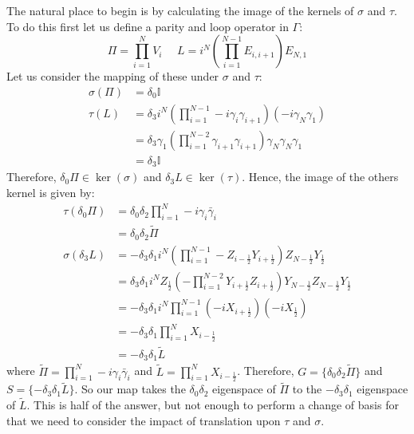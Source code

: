 \documentclass{article}
\begin{document}
The natural place to begin is by calculating the image of the kernels of $\sigma$ and $\tau$. To do this first let us define a parity and loop operator in $\Gamma$:
\begin{equation}
    \Pi = \prod_{i=1}^N V_i \>\>\>\>\>\> L = i^N \left( \prod_{i=1}^{N-1}E_{i,i+1}\right) E_{N,1}
\end{equation}
Let us consider the mapping of these under $\sigma$ and $\tau$:
\begin{align}
    \sigma(\Pi) &= \delta_0 \mathbb{I}\\
    \tau(L) &=  \delta_3 i^N \left( \prod_{i=1}^{N-1}-i\gamma_i\gamma_{i+1}\right)(-i\gamma_N\gamma_{1}) \\
    &= \delta_3 \gamma_1  \left( \prod_{i=1}^{N-2}\gamma_{i+1}\gamma_{i+1}\right)\gamma_N\gamma_N\gamma_{1}\\
    &= \delta_3 \mathbb{I}
\end{align}
Therefore, $\delta_0 \Pi \in \ker(\sigma)$ and $\delta_3 L \in \ker(\tau)$. Hence, the image of the others kernel is given by:
\begin{align}
    \tau( \delta_0\Pi) &= \delta_0 \delta_2 \prod_{i=1}^N -i \gamma_i \bar{\gamma}_i \\&= \delta_0 \delta_2 \tilde{\Pi}\\
    \sigma(\delta_3 L) &= -\delta_3\delta_1 i^N \left( \prod_{i=1}^{N-1}-Z_{i-\frac{1}{2}}Y_{i+\frac{1}{2}}\right) Z_{N-\frac{1}{2}}Y_{\frac{1}{2}}\\
    &= \delta_3\delta_1 i^N Z_{\frac{1}{2}}\left( -\prod_{i=1}^{N-2}Y_{i+\frac{1}{2}}Z_{i+\frac{1}{2}}\right) Y_{N-\frac{1}{2}}Z_{N-\frac{1}{2}}Y_{\frac{1}{2}}\\
    &= -\delta_3\delta_1 i^N \prod_{i=1}^{N-1}(-iX_{i+\frac{1}{2}}) (-i X_{\frac{1}{2}})\\
    &= -\delta_3\delta_1 \prod_{i=1}^N X_{i-\frac{1}{2}}\\
    &= -\delta_3\delta_1 \tilde{L}
\end{align}
where $\tilde \Pi = \prod_{i=1}^N -i \gamma_i \bar{\gamma}_i$ and $\tilde{L} = \prod_{i=1}^N X_{i-\frac{1}{2}}$. Therefore, $G = \{\delta_0\delta_2 \tilde{\Pi}\}$ and $S = \{ -\delta_3\delta_1 \tilde L\}$. So our map takes the $\delta_0 \delta_2$ eigenspace of $\tilde \Pi$ to the $-\delta_3 \delta_1$ eigenspace of $\tilde L$. This is half of the answer, but not enough to perform a change of basis for that we need to consider the impact of translation upon $\tau$ and $\sigma$.
\end{document}
